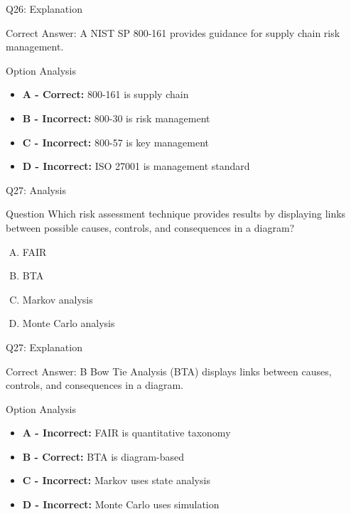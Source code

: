 \documentclass{beamer}
\begin{document}
	\begin{frame}{Q26: Explanation}
		\begin{block}{Correct Answer: A}
			NIST SP 800-161 provides guidance for supply chain risk management.
		\end{block}
		\begin{block}{Option Analysis}
			\begin{itemize}
				\item \textbf{A - Correct:} 800-161 is supply chain
				\item \textbf{B - Incorrect:} 800-30 is risk management
				\item \textbf{C - Incorrect:} 800-57 is key management
				\item \textbf{D - Incorrect:} ISO 27001 is management standard
			\end{itemize}
		\end{block}
	\end{frame}
	
	\begin{frame}{Q27: Analysis}
		\begin{block}{Question}
			Which risk assessment technique provides results by displaying links between possible causes, controls, and consequences in a diagram?
		\end{block}
		\begin{enumerate}[(A)]
			\item FAIR
			\item BTA
			\item Markov analysis
			\item Monte Carlo analysis
		\end{enumerate}
	\end{frame}
	
	\begin{frame}{Q27: Explanation}
		\begin{block}{Correct Answer: B}
			Bow Tie Analysis (BTA) displays links between causes, controls, and consequences in a diagram.
		\end{block}
		\begin{block}{Option Analysis}
			\begin{itemize}
				\item \textbf{A - Incorrect:} FAIR is quantitative taxonomy
				\item \textbf{B - Correct:} BTA is diagram-based
				\item \textbf{C - Incorrect:} Markov uses state analysis
				\item \textbf{D - Incorrect:} Monte Carlo uses simulation
			\end{itemize}
		\end{block}
	\end{frame}
	
\end{document}
